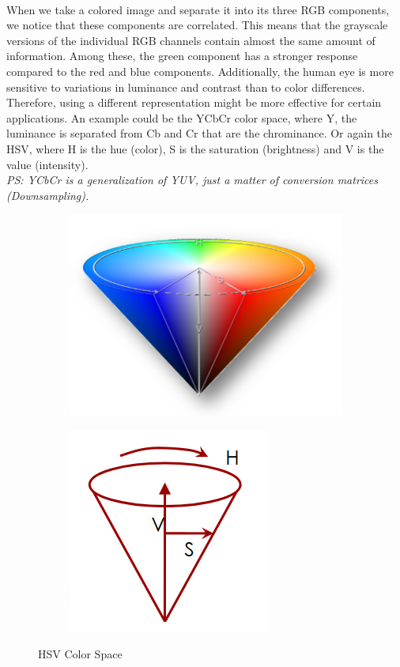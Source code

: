 \\When we take a colored image and separate it into its three RGB components, we notice that these components are correlated. This means that the grayscale versions of the individual RGB channels contain almost the same amount of information. 
Among these, the green component has a stronger response compared to the red and blue components. Additionally, the human eye is more sensitive to variations in luminance and contrast than to color differences. 
Therefore, using a different representation might be more effective for certain applications.
An example could be the YCbCr color space, where Y, the luminance is separated from Cb and Cr that are the chrominance.
Or again the HSV, where H is the hue (color), S is the saturation (brightness) and V is the value (intensity).
\\\textit{PS: YCbCr is a generalization of YUV, just a matter of conversion matrices (Downsampling).}

\begin{figure}[h]
    \begin{subfigure}{0.5\textwidth}
        \includegraphics[scale=0.4]{Figures/HSV1.png} 
        \label{fig:subim1}
    \end{subfigure}
    \begin{subfigure}{0.5\textwidth}
        \includegraphics[scale=0.5]{Figures/HSV2.png}
        \label{fig:subim2}
    \end{subfigure}
        
        \caption{HSV Color Space}
        \label{fig:image2}
\end{figure}

